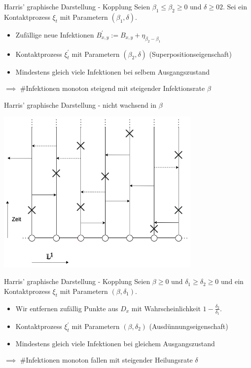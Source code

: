 \documentclass[11pt]{beamer}
\begin{document}
\begin{frame}{Harris' graphische Darstellung - Kopplung}
    Seien $\beta_1 \leq \beta_2 \geq 0$ und $\delta \geq 02$. Sei ein Kontaktprozess $\xi_t$ mit Parametern $(\beta_1, \delta)$.
    \begin{itemize}
        \item<2-> Zufällige neue Infektionen $B^\prime_{x, y} := B_{x, y} + \eta_{\beta_2 - \beta_1}$
        \item<3-> Kontaktprozess $\xi_t^\prime$ mit Parametern $(\beta_2, \delta)$ (Superpositionseigenschaft)
        \item<4-> Mindestens gleich viele Infektionen bei selbem Ausgangszustand
    \end{itemize}
    $\implies$ \#Infektionen monoton steigend mit steigender Infektionsrate $\beta$
\end{frame}

\begin{frame}{Harris' graphische Darstellung - nicht wachsend in $\beta$}
    \begin{center}
        \includegraphics[width=0.75\textwidth]{images/contact process dotted arrows.png}
    \end{center}
\end{frame}

\begin{frame}{Harris' graphische Darstellung - Kopplung}
    Seien $\beta \geq 0$ und $\delta_1 \geq \delta_2 \geq 0$ und ein Kontaktprozess $\xi_t$ mit Parametern $(\beta, \delta_1)$.
    \begin{itemize}
        \item<2-> Wir entfernen zufällig Punkte aus $D_x$ mit Wahrscheinlichkeit
        $1 - \frac{\delta_2}{\delta_1}$.
        \item<3-> Kontaktprozess $\xi_t^\prime$ mit Parametern $(\beta, \delta_2)$ (Ausdünnungseigenschaft)
        \item<4-> Mindestens gleich viele Infektionen bei gleichem Ausgangszustand
    \end{itemize}
    $\implies$ \#Infektionen monoton fallen mit steigender Heilungsrate $\delta$
\end{frame}
\end{document}
